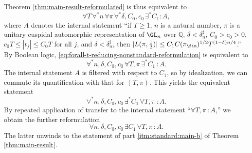 Theorem \ref{thm:main-result-reformulated} is thus equivalent to
\begin{equation}\label{eq:forall-t-reducing-nonstandard-reformulation}
  \forall T \,
  \forall^* n \,
  \forall \pi \,
  \forall^* \delta , C_0, c_0 \,
  \exists^* C_1 : A,
\end{equation}
where $A$ denotes the internal statement ``if $T \geq 1$, $n$ is a natural number, $\pi$ is a unitary cuspidal automorphic representation of $\GL_n$ over $\mathbb{Q}$, $\delta < \delta_n^\sharp$, $C_0 > c_0 > 0$, $c_0 T \leq |t_j| \leq C_0 T$ for all $j$, and $\delta < \delta_n^\sharp$, then $|L(\pi,\tfrac{1}{2})| \leq C_1 C(\pi_{\fin})^{1/2} T^{(1-\delta) n/4}$.''  By Boolean logic, \eqref{eq:forall-t-reducing-nonstandard-reformulation} is equivalent to
\begin{equation*}
  \forall^* n, \delta , C_0, c_0  \,
  \forall T , \pi  \,
  \exists^* C_1 \, : A.
\end{equation*}
The internal statement $A$ is filtered with respect to $C_1$, so by idealization, we can commute its quantification with that for $(T,\pi)$.  This yields the equivalent statement
\begin{equation}\label{eq:forall-n-delta}
  \forall^* n, \delta , C_0, c_0  \,
  \exists^* C_1 \,
  \forall T , \pi  \,
  : A.
\end{equation}
By repeated application of transfer to the internal statement ``$\forall T, \pi \, : A$,'' we obtain the further reformulation
\begin{equation*}
  \forall n, \delta , C_0, c_0  \,
  \exists C_1 \,
  \forall T , \pi  \,
  : A.
\end{equation*}
The latter unwinds to the statement of part \eqref{itm:standard:main-b} of Theorem \ref{thm:main-result}.



